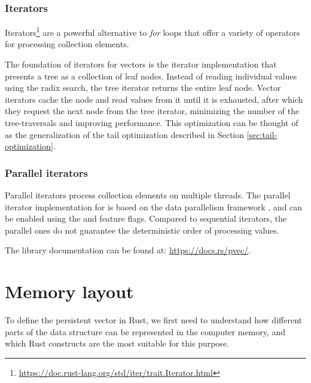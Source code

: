\subsubsection*{Iterators}
Iterators\footnote{\url{https://doc.rust-lang.org/std/iter/trait.Iterator.html}} are a powerful alternative to \emph{for} loops that offer a variety of operators for processing collection elements.

The foundation of iterators for \pvecrs{} vectors is the \rrbtree{} iterator implementation that presents a tree as a collection of leaf nodes. Instead of reading individual values using the radix search, the tree iterator returns the entire leaf node. Vector iterators cache the node and read values from it until it is exhausted, after which they request the next node from the tree iterator, minimizing the number of the tree-traversals and improving performance. This optimization can be thought of as the generalization of the tail optimization described in Section \ref{sec:tail-optimization}.

\subsubsection*{Parallel iterators}
Parallel iterators process collection elements on multiple threads. The parallel iterator implementation for \pvecrs{} is based on the data parallelism framework \rayon{}, and can be enabled using the  and  feature flags. Compared to sequential iterators, the parallel ones do not guarantee the deterministic order of processing values.

The library documentation can be found at: \url{https://docs.rs/pvec/}.


\section{Memory layout}
To define the persistent vector in Rust, we first need to understand how different parts of the data structure can be represented in the computer memory, and which Rust constructs are the most suitable for this purpose.

